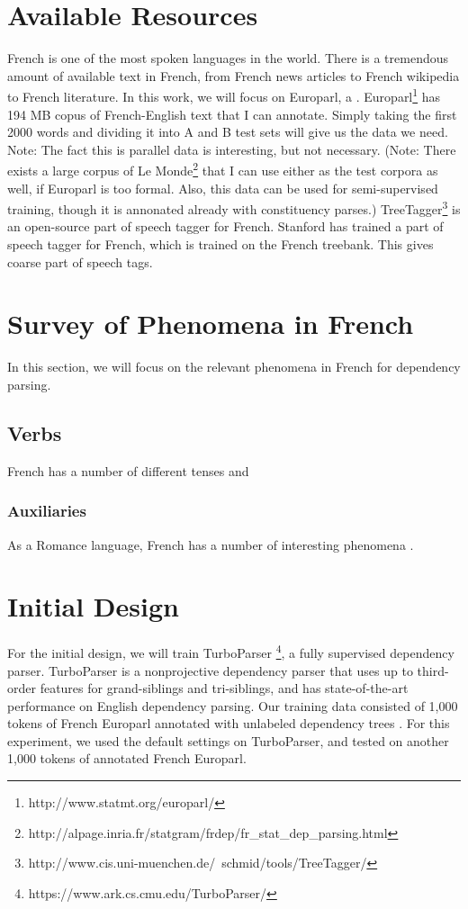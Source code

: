 \documentclass[11pt,letterpaper]{article}
\begin{document}
\section{Available Resources}
French is one of the most spoken languages in the world. There is a tremendous amount of available text in French, from French news articles to French wikipedia to French literature. In this work, we will focus on Europarl, a . Europarl\footnote{http://www.statmt.org/europarl/} has 194 MB copus of French-English text that I can annotate. Simply taking the first 2000 words and dividing it into A and B test sets will give us the data we need. Note: The fact this is parallel data is interesting, but not necessary. (Note: There exists a large corpus of Le Monde\footnote{http://alpage.inria.fr/statgram/frdep/fr_stat_dep_parsing.html} that I can use either as the test corpora as well, if Europarl is too formal. Also, this data can be used for semi-supervised training, though it is annonated already with constituency parses.) 
TreeTagger\footnote{http://www.cis.uni-muenchen.de/~schmid/tools/TreeTagger/} is an open-source part of speech tagger for French. 
Stanford has trained a part of speech tagger for French, which is trained on the French treebank. This gives coarse part of speech tags. 

\section{Survey of Phenomena in French}
In this section, we will focus on the relevant phenomena in French for dependency parsing. 
\subsection{Verbs}
French has a number of different tenses and 
\subsubsection{Auxiliaries}
As a Romance language, French has a number of interesting phenomena . 


\section{Initial Design}
For the initial design, we will train TurboParser \footnote{https://www.ark.cs.cmu.edu/TurboParser/}, a fully supervised dependency parser. TurboParser is a nonprojective dependency parser that uses up to third-order features for grand-siblings and tri-siblings, and has state-of-the-art performance on English dependency parsing. Our training data consisted of 1,000 tokens of French Europarl annotated with unlabeled dependency trees . For this experiment, we used the default settings on TurboParser, and tested on another 1,000 tokens of annotated French Europarl. 
\end{document}
